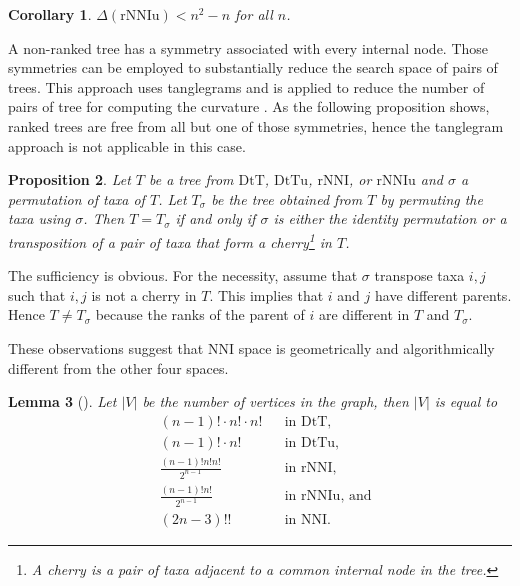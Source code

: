 \documentclass{amsart}
\newtheorem{lemma}{Lemma}
\newtheorem{proposition}[lemma]{Proposition}
\newtheorem{corollary}[lemma]{Corollary}
\theoremstyle{definition}
\newcommand{\nni}{\mathrm{NNI}}
\newcommand{\rnni}{\mathrm{rNNI}}
\newcommand{\rnniu}{\mathrm{rNNIu}}
\newcommand{\mdts}{\mathrm{DtT}}
\newcommand{\mdtsu}{\mathrm{DtTu}}
\begin{document}
\begin{corollary}\label{diameterUpperBoundCoro}
$\Delta(\rnniu) < n^2 - n$ for all $n$.
\end{corollary}

A non-ranked tree has a symmetry associated with every internal node.
Those symmetries can be employed to substantially reduce the search space of pairs of trees.
This approach uses tanglegrams \autocite{Matsen2015-fn} and is applied to reduce the number of pairs of tree for computing the curvature \autocite{Whidden2015-es}.
As the following proposition shows, ranked trees are free from all but one of those symmetries, hence the tanglegram approach is not applicable in this case.

\begin{proposition}
Let $T$ be a tree from $\mdts$, $\mdtsu$, $\rnni$, or $\rnniu$ and $\sigma$ a permutation of taxa of $T$.
Let $T_\sigma$ be the tree obtained from $T$ by permuting the taxa using $\sigma$.
Then $T = T_\sigma$ if and only if $\sigma$ is either the identity permutation or a transposition of a pair of taxa that form a
cherry\footnote{A {\em cherry} is a pair of taxa adjacent to a common internal node in the tree.}
in $T$.
\end{proposition}

\proof
The sufficiency is obvious.
For the necessity, assume that $\sigma$ transpose taxa $i,j$ such that $i,j$ is not a cherry in $T$.
This implies that $i$ and $j$ have different parents.
Hence $T \ne T_\sigma$ because the ranks of the parent of $i$ are different in $T$ and $T_\sigma$.
\endproof

These observations suggest that $\nni$ space is geometrically and algorithmically different from the other four spaces.

\begin{lemma}[\textcite{Semple2003-nj}]\label{spaceSizes}
Let $|V|$ be the number of vertices in the graph, then $|V|$ is equal to
\begin{align*}
& (n-1)! \cdot n! \cdot n!	&& \mbox{in $\mdts$,}\\
& (n-1)! \cdot n!		&& \mbox{in $\mdtsu$,}\\
& \frac{(n-1)!n!n!}{2^{n-1}}	&& \mbox{in $\rnni$,}\\
& \frac{(n-1)!n!}{2^{n-1}}	&& \mbox{in $\rnniu$, and}\\
& (2n - 3)!!			&& \mbox{in $\nni$.}
\end{align*}
\end{lemma}
\end{document}
